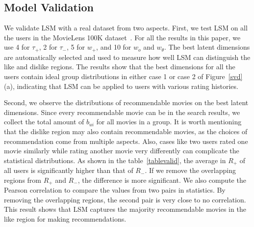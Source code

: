 \documentclass{vgtc}                          %
\begin{document}

\subsection{Model Validation}

We validate LSM with a real dataset from two aspects.
First, we test LSM on all the users in the MovieLens 100K dataset~\cite{MovieLens100k}.
For all the results in this paper, we use 4 for $\tau_+$, 2 for  $\tau_-$, 5 for $w_+$, and 10 for $w_o$ and $w_{\theta}$.
The best latent dimensions are automatically selected and used to measure how well LSM can distinguish the like and dislike regions.
The results show that the best dimensions for all the users contain ideal group distributions in either case 1 or case 2 of Figure~\ref{svd} (a), indicating that LSM can be applied to users with various rating histories.

Second, we observe the distributions of recommendable movies on the best latent dimensions.
Since every recommendable movie can be in the search results, we collect the total amount of $b_{ui}$ for all movies in a group. 
It is worth mentioning that the dislike region may also contain recommendable movies, as the choices of recommendation come from multiple aspects. %
Also, cases like two users rated one movie similarly while rating another movie very differently can complicate the statistical distributions.
As shown in the table~\ref{tablevalid}, the average in $R_+$ of all users is significantly higher than that of $R_-$.
If we remove the overlapping regions from $R_+$ and $R_-$, the difference is more significant. 
We also compute the Pearson correlation to compare the values from two pairs in statistics.
By removing the overlapping regions, the second pair is very close to no correlation.
This result shows that LSM captures the majority recommendable movies in the like region for making recommendations.
\end{document}
